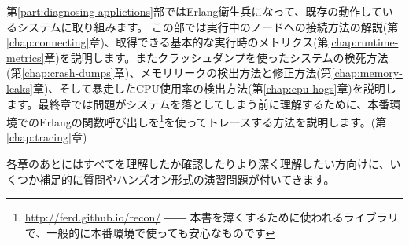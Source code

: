 第\ref{part:diagnosing-applictions}部ではErlang衛生兵になって、既存の動作しているシステムに取り組みます。
この部では実行中のノードへの接続方法の解説(第\ref{chap:connecting}章)、取得できる基本的な実行時のメトリクス(第\ref{chap:runtime-metrics}章)を説明します。またクラッシュダンプを使ったシステムの検死方法(第\ref{chap:crash-dumps}章)、メモリリークの検出方法と修正方法(第\ref{chap:memory-leaks}章)、そして暴走したCPU使用率の検出方法(第\ref{chap:cpu-hogs}章)を説明します。最終章では問題がシステムを落としてしまう前に理解するために、本番環境でのErlangの関数呼び出しを\footnote{\href{http://ferd.github.io/recon/}{http://ferd.github.io/recon/} ―― 本書を薄くするために使われるライブラリで、一般的に本番環境で使っても安心なものです}を使ってトレースする方法を説明します。(第\ref{chap:tracing}章)

各章のあとにはすべてを理解したか確認したりより深く理解したい方向けに、いくつか補足的に質問やハンズオン形式の演習問題が付いてきます。

